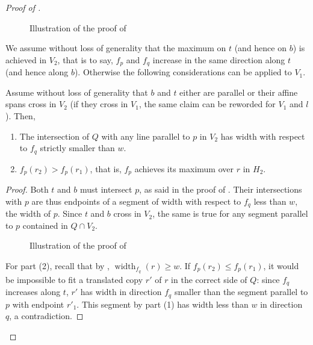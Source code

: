 \documentclass[12pt]{article}
\newcommand{\width}{\operatorname{width}}
\begin{document}
\begin{proof}[Proof of ]
\begin{figure}[htb]
\scalebox{.75}{}
\caption{Illustration of the proof of }
\label{fig:claim2}
\end{figure}

We assume without loss of generality that the maximum on $t$ (and hence on $b$) is achieved in $V_2$, that is to say, $f_p$ and $f_q$ increase in the same direction along $t$ (and hence along $b$). Otherwise the following considerations can be applied to $V_1$. 

\begin{claim}
\label{claim:r}
Assume without loss of generality that $b$ and $t$ either are parallel or their affine spans cross in $V_2$ (if they cross in $V_1$, the same claim can be reworded for $V_1$ and $l$). Then, 
\begin{enumerate}
\item The intersection of $Q$ with any line parallel to $p$ in $V_2$ has width with respect to $f_q$ strictly smaller than $w$.
\item $f_p(r_2) > f_p(r_1)$, that is, $f_p$ achieves its maximum over $r$ in $H_2$.
\end{enumerate}
\end{claim}

\begin{proof}
Both $t$ and $b$ must intersect $p$, as said in the proof of .  Their intersections with $p$ are thus endpoints of a segment of width with respect to $f_q$ less than $w$, the width of $p$. Since $t$ and $b$ cross in $V_2$, the same is true for any segment parallel to $p$ contained in $Q \cap V_2$.  

\begin{figure}[htb]
\scalebox{.75}{}
\caption{Illustration of the proof of }
\label{fig:claim3}
\end{figure}

For part (2), recall that by , $\width_{f_q}(r) \geq w$. If $f_p(r_2) \leq f_p(r_1)$, it would be impossible to fit a translated copy $r'$ of $r$ in the correct side of $Q$: since $f_q$ increases along $t$, $r'$ has width in direction $f_q$ smaller than the segment parallel to $p$ with endpoint $r'_1$. This segment by part (1) has width less than $w$ in direction $q$, a contradiction. 

\end{proof}


\end{proof}
\end{document}
